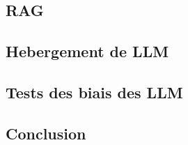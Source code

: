 \subsection{RAG}

\subsection{Hebergement de LLM}

\subsection{Tests des biais des LLM}

\subsection{Conclusion}

